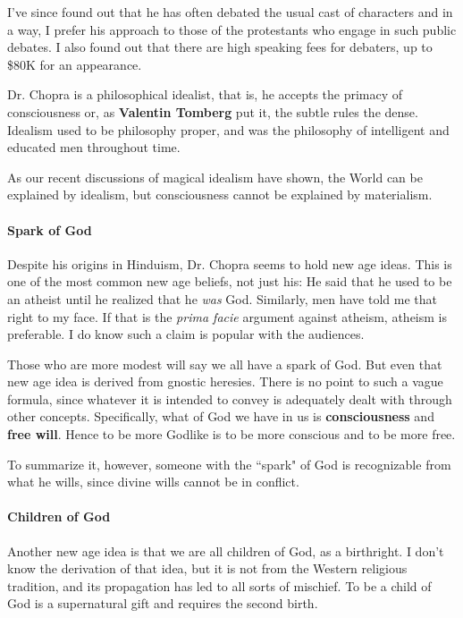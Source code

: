 I've since found out that he has often debated the usual cast of characters and in a way, I prefer his approach to those of the protestants who engage in such public debates. I also found out that there are high speaking fees for debaters, up to \$80K for an appearance.

Dr. Chopra is a philosophical idealist, that is, he accepts the primacy of consciousness or, as \textbf{Valentin Tomberg} put it, the subtle rules the dense. Idealism used to be philosophy proper, and was the philosophy of intelligent and educated men throughout time.

As our recent discussions of magical idealism have shown, the World can be explained by idealism, but consciousness cannot be explained by materialism.

\paragraph{Spark of God}
Despite his origins in Hinduism, Dr. Chopra seems to hold new age ideas. This is one of the most common new age beliefs, not just his: He said that he used to be an atheist until he realized that he \emph{was} God. Similarly, men have told me that right to my face. If that is the \emph{prima facie} argument against atheism, atheism is preferable. I do know such a claim is popular with the audiences.

Those who are more modest will say we all have a spark of God. But even that new age idea is derived from gnostic heresies. There is no point to such a vague formula, since whatever it is intended to convey is adequately dealt with through other concepts. Specifically, what of God we have in us is \textbf{consciousness} and \textbf{free will}. Hence to be more Godlike is to be more conscious and to be more free.

To summarize it, however, someone with the ``spark" of God is recognizable from what he wills, since divine wills cannot be in conflict.

\paragraph{Children of God}
Another new age idea is that we are all children of God, as a birthright. I don't know the derivation of that idea, but it is not from the Western religious tradition, and its propagation has led to all sorts of mischief. To be a child of God is a supernatural gift and requires the second birth.

